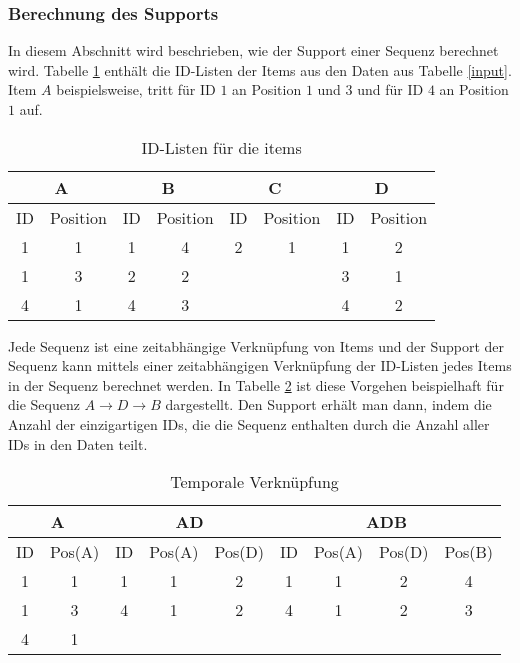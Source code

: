 \subsubsection*{Berechnung des Supports}
In diesem Abschnitt wird beschrieben, wie der Support einer Sequenz berechnet wird. Tabelle \ref{idlist} enthält die ID-Listen der Items aus den Daten aus Tabelle \ref{input}. Item $A$ beispielsweise, tritt für ID $1$ an Position $1$ und $3$ und für ID $4$ an Position $1$ auf.\\
\begin{table}[hbt]
\centering
\begin{tabular}{c|c|c|c|c|c|c|c}
\multicolumn{2}{c|}{A} & \multicolumn{2}{c|}{B} & \multicolumn{2}{c|}{C} & \multicolumn{2}{c}{D} \\ \hline
ID & Position  & ID & Position  & ID & Position  & ID & Position  \\ \hline
1	 & 1				 & 1  & 4				  & 2  & 1				 & 1  & 2 \\
1  & 3				 & 2  &	2			    &    &  				 & 3  & 1 \\
4  & 1				 & 4  &	3			    &    &  				 & 4  & 2 
\end{tabular}
\caption{ID-Listen für die items}\label{idlist}
\end{table}
Jede Sequenz ist eine zeitabhängige Verknüpfung von Items und der Support der Sequenz kann mittels einer zeitabhängigen Verknüpfung der ID-Listen jedes Items in der Sequenz berechnet werden. In Tabelle \ref{tempjoin} ist diese Vorgehen beispielhaft für die Sequenz $A\rightarrow D\rightarrow B$ dargestellt. Den Support erhält man dann, indem die Anzahl der einzigartigen IDs, die die Sequenz enthalten durch die Anzahl aller IDs in den Daten teilt.\\
\begin{table}[hbt]
\centering
\begin{tabular}{c|c||c|c|c||c|c|c|c}
\multicolumn{2}{c||}{A} & \multicolumn{3}{c||}{AD} & \multicolumn{4}{c}{ADB} \\ \hline \hline
ID & Pos(A) 	    		  & ID & Pos(A) & Pos(D) 		 & ID & Pos(A) & Pos(D) & Pos(B) \\ \hline
1  & 1									& 1  & 1			& 2          & 1  & 1			 & 2      & 4 \\
1  & 3									& 4  & 1      & 2          & 4  & 1      & 2      & 3 \\
4  & 1									& 	 & 				&            & 	  & 			 &        &	
\end{tabular}
\caption{Temporale Verknüpfung}\label{tempjoin}
\end{table}
